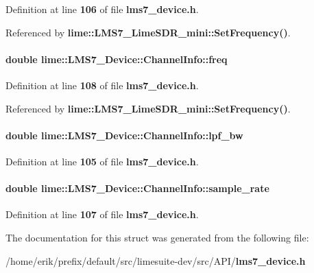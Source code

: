 Definition at line {\bf 106} of file {\bf lms7\+\_\+device.\+h}.



Referenced by {\bf lime\+::\+L\+M\+S7\+\_\+\+Lime\+S\+D\+R\+\_\+mini\+::\+Set\+Frequency()}.

\paragraph[{freq}]{\setlength{\rightskip}{0pt plus 5cm}double lime\+::\+L\+M\+S7\+\_\+\+Device\+::\+Channel\+Info\+::freq}\label{structlime_1_1LMS7__Device_1_1ChannelInfo_a327d1c7a5cf3dd917283221f71da7bc3}


Definition at line {\bf 108} of file {\bf lms7\+\_\+device.\+h}.



Referenced by {\bf lime\+::\+L\+M\+S7\+\_\+\+Lime\+S\+D\+R\+\_\+mini\+::\+Set\+Frequency()}.

\paragraph[{lpf\+\_\+bw}]{\setlength{\rightskip}{0pt plus 5cm}double lime\+::\+L\+M\+S7\+\_\+\+Device\+::\+Channel\+Info\+::lpf\+\_\+bw}\label{structlime_1_1LMS7__Device_1_1ChannelInfo_a65022990af0bfb84e119938bd3892c23}


Definition at line {\bf 105} of file {\bf lms7\+\_\+device.\+h}.

\paragraph[{sample\+\_\+rate}]{\setlength{\rightskip}{0pt plus 5cm}double lime\+::\+L\+M\+S7\+\_\+\+Device\+::\+Channel\+Info\+::sample\+\_\+rate}\label{structlime_1_1LMS7__Device_1_1ChannelInfo_a247d4a31f9f379f0fd8d8cbc04f121f6}


Definition at line {\bf 107} of file {\bf lms7\+\_\+device.\+h}.



The documentation for this struct was generated from the following file\+:\begin{DoxyCompactItemize}
\item 
/home/erik/prefix/default/src/limesuite-\/dev/src/\+A\+P\+I/{\bf lms7\+\_\+device.\+h}\end{DoxyCompactItemize}
